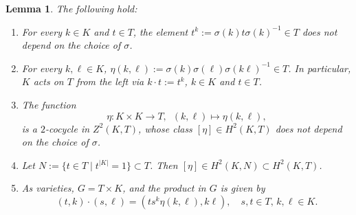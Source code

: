 \documentclass{amsart}
\newtheorem{lemma}[theorem]{Lemma}
\theoremstyle{definition}
\numberwithin{equation}{section}
\begin{document}
\begin{lemma}\label{cohclassgamma}
The following hold:
\begin{enumerate}
\item
For every $k\in K$ and $t\in T$, the element $t^k:=\sigma(k)t\sigma(k)^{-1}\in T$ does not depend on the choice of $\sigma$.
\item
For every $k,\ell\in K$, $\eta(k,\ell):=\sigma(k)\sigma(\ell)\sigma(k\ell)^{-1}\in T$. In particular, $K$ acts on $T$ from the left via $k\cdot t:=t^k$, $k\in K$ and $t\in T$.
\item
The function
\begin{equation*}
\eta:K\times K\to T,\,\,\,(k,\ell)\mapsto \eta(k,\ell), 
\end{equation*}
is a $2$-cocycle in $Z^2(K,T)$, whose class $[\eta]\in H^2(K,T)$ does not depend on the choice of $\sigma$.
\item
Let $N:=\{t\in T\mid t^{|K|}=1\}\subset T$. Then $[\eta]\in H^2(K,N)\subset H^2(K,T)$.
\item
As varieties, $G=T\times K$, and the product in $G$ is given by
\begin{equation*}
(t,{k})\cdot(s,{\ell})=\left(ts^k\eta(k,\ell),{k}{\ell}\right),\quad s,t\in T,\,k,\ell\in K.
\end{equation*}
\end{enumerate}
\end{lemma}
\end{document}
